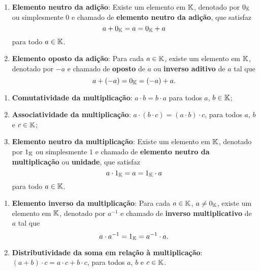 \documentclass{beamer}
\begin{document}
    \begin{frame}
        \begin{definicao}
            \begin{enumerate}[label={\roman*})]
                \conti
		\item \textbf{Elemento neutro da adi\c{c}\~ao}: Existe um elemento em $\mathbb{K}$, denotado por $0_{\mathbb{K}}$ ou simplesmente $0$ e chamado de \textbf{elemento neutro da adi\c{c}\~ao}, que satisfaz
		\[
			a + 0_{\mathbb{K}} = a = 0_{\mathbb{K}} + a
		\]
		para todo $a \in \mathbb{K}$.
		\item \textbf{Elemento oposto da adi\c{c}\~ao}: Para cada $a \in \mathbb{K}$, existe um elemento em $\mathbb{K}$, denotado por $-a$ e chamado de \textbf{oposto} de $a$ ou \textbf{inverso aditivo} de $a$ tal que
		\[
			a + (-a) = 0_{\mathbb{K}} = (-a) + a.
		\]

                \seti
            \end{enumerate}
        \end{definicao}
    \end{frame}
    
    \begin{frame}
        \begin{definicao}
            \begin{enumerate}[label={\roman*})]
                \conti

		\item \textbf{Comutatividade da multiplica\c{c}\~ao}: $a \cdot b = b \cdot a$ para todos $a$, $b \in \mathbb{K}$;
		\item \textbf{Associatividade da multiplica\c{c}\~ao}: $a \cdot (b \cdot c) = (a \cdot b) \cdot c$, para todos $a$, $b$ e $c \in \mathbb{K}$;
		\item \textbf{Elemento neutro da multiplica\c{c}\~ao}: Existe um elemento em $\mathbb{K}$, denotado por $1_{\mathbb{K}}$ ou simplesmente $1$ e chamado de \textbf{elemento neutro da multiplica\c{c}\~ao} ou \textbf{unidade}, que satisfaz
		\[
			a \cdot 1_{\mathbb{K}} = a = 1_{\mathbb{K}} \cdot a
		\]
		para todo $a \in \mathbb{K}$.
	
                \seti
            \end{enumerate}
        \end{definicao}
    \end{frame}
    
    \begin{frame}
        \begin{definicao}
            \begin{enumerate}[label={\roman*})]
                \conti

	\item \textbf{Elemento inverso da multiplica\c{c}\~ao}: Para cada $a \in \mathbb{K}$, $a \ne 0_{\mathbb{K}}$, existe um elemento em $\mathbb{K}$, denotado por $a^{-1}$ e chamado de \textbf{inverso multiplicativo} de $a$
		tal que
		\[
			a \cdot a^{-1} = 1_{\mathbb{K}} = a^{-1} \cdot a.
		\]
		\item \textbf{Distributividade da soma em rela\c{c}\~ao \`a multiplica\c{c}\~ao}: $(a + b)\cdot c = a\cdot c + b\cdot c$, para todos $a$, $b$ e $c \in \mathbb{K}$.
	    \end{enumerate}
        \end{definicao}
    \end{frame}
\end{document}
